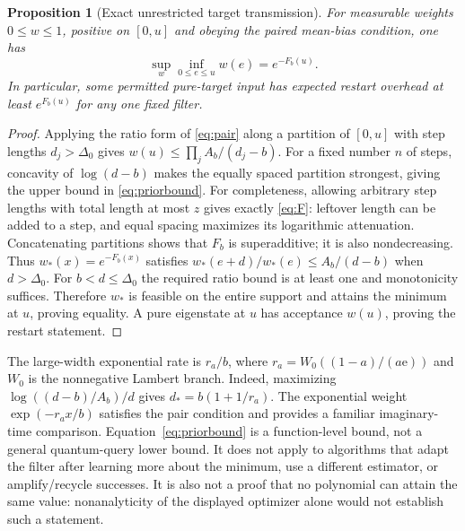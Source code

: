 \documentclass[11pt]{article}
\newtheorem{proposition}[theorem]{Proposition}
\begin{document}
\begin{proposition}[Exact unrestricted target transmission]\label{prop:prior}
For measurable weights $0\leq w\leq1$, positive on $[0,u]$ and obeying
the paired mean-bias condition, one has
\begin{equation}\label{eq:priorbound}
 \sup_w\inf_{0\leq e\leq u}w(e)=e^{-F_b(u)}.
\end{equation}
In particular, some permitted pure-target input has expected restart
overhead at least $e^{F_b(u)}$ for any one fixed filter.
\end{proposition}
\begin{proof}
Applying the ratio form of \eqref{eq:pair} along a partition of $[0,u]$
with step lengths $d_j>\Delta_0$ gives
$w(u)\leq\prod_j A_b/(d_j-b)$. For a fixed number $n$ of steps,
concavity of $\log(d-b)$ makes the equally spaced partition strongest,
giving the upper bound in \eqref{eq:priorbound}.
For completeness, allowing arbitrary step lengths with total length at
most $z$ gives exactly \eqref{eq:F}: leftover length can be added to a
step, and equal spacing maximizes its logarithmic attenuation. Concatenating
partitions shows that $F_b$ is superadditive; it is also nondecreasing.
Thus $w_*(x)=e^{-F_b(x)}$ satisfies
$w_*(e+d)/w_*(e)\leq A_b/(d-b)$ when $d>\Delta_0$.
For $b<d\leq\Delta_0$ the required ratio bound is at least one and
monotonicity suffices. Therefore $w_*$ is feasible on the entire support
and attains the minimum at $u$, proving equality. A pure eigenstate at
$u$ has acceptance $w(u)$, proving the restart statement.
\end{proof}

The large-width exponential rate is $r_a/b$, where
$r_a=W_0((1-a)/(a\mathrm e))$ and $W_0$ is the nonnegative Lambert branch.
Indeed, maximizing $\log((d-b)/A_b)/d$ gives
$d_*=b(1+1/r_a)$. The exponential weight $\exp(-r_a x/b)$ satisfies
the pair condition and provides a familiar imaginary-time comparison.
Equation~\eqref{eq:priorbound} is a function-level bound, not a general
quantum-query lower bound. It does not apply to algorithms that adapt the
filter after learning more about the minimum, use a different estimator,
or amplify/recycle successes. It is also not a proof that no polynomial
can attain the same value: nonanalyticity of the displayed optimizer
alone would not establish such a statement.
\end{document}
